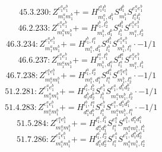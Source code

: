 \documentclass[letterpaper,10pt,fleqn,leqno,onecolumn]{article}
\begin{document}
\begin{equation} \;\;\;\;\;\;  45.3.230: Z^{e_{1}^{a}e_{1}^{b}}_{m_{1}^{a}m_{1}^{b}}+=H^{l_{1}^{a}l_{1}^{b}}_{m_{1}^{a},d_{1}^{b}}S^{d_{1}^{b}}_{m_{1}^{b}}S^{e_{1}^{a}e_{1}^{b}}_{l_{1}^{a}l_{1}^{b}} \end{equation}
\begin{equation} \;\;\;\;\;\;  46.2.233: Z^{e_{1}^{a}e_{1}^{b}}_{m_{1}^{a}m_{1}^{b}}+=H^{l_{1}^{b},l_{2}^{b}}_{m_{1}^{b},d_{1}^{b}}S^{d_{1}^{b}}_{l_{1}^{b}}S^{e_{1}^{a}e_{1}^{b}}_{m_{1}^{a},l_{2}^{b}} \end{equation}
\begin{equation} \;\;\;\;\;\;  46.3.234: Z^{e_{1}^{a}e_{1}^{b}}_{m_{1}^{a}m_{1}^{b}}+=H^{l_{1}^{b},l_{1}^{a}}_{m_{1}^{a},d_{1}^{b}}S^{d_{1}^{b}}_{l_{1}^{b}}S^{e_{1}^{a}e_{1}^{b}}_{m_{1}^{b},l_{1}^{a}}\cdot -1/1 \end{equation}
\begin{equation} \;\;\;\;\;\;  46.6.237: Z^{e_{1}^{a}e_{1}^{b}}_{m_{1}^{a}m_{1}^{b}}+=H^{l_{1}^{a},l_{1}^{b}}_{m_{1}^{b},d_{1}^{a}}S^{d_{1}^{a}}_{l_{1}^{a}}S^{e_{1}^{a}e_{1}^{b}}_{m_{1}^{a},l_{1}^{b}} \end{equation}
\begin{equation} \;\;\;\;\;\;  46.7.238: Z^{e_{1}^{a}e_{1}^{b}}_{m_{1}^{a}m_{1}^{b}}+=H^{l_{1}^{a},l_{2}^{a}}_{m_{1}^{a},d_{1}^{a}}S^{d_{1}^{a}}_{l_{1}^{a}}S^{e_{1}^{a}e_{1}^{b}}_{m_{1}^{b},l_{2}^{a}}\cdot -1/1 \end{equation}
\begin{equation} \;\;\;\;\;\;  51.2.281: Z^{e_{1}^{a}e_{1}^{b}}_{m_{1}^{a}m_{1}^{b}}+=H^{l_{1}^{b},l_{2}^{b}}_{d_{1}^{b}d_{2}^{b}}S^{e_{1}^{b}}_{l_{1}^{b}}S^{e_{1}^{a},d_{1}^{b}d_{2}^{b}}_{m_{1}^{a}m_{1}^{b},l_{2}^{b}}\cdot -1/1 \end{equation}
\begin{equation} \;\;\;\;\;\;  51.4.283: Z^{e_{1}^{a}e_{1}^{b}}_{m_{1}^{a}m_{1}^{b}}+=H^{l_{1}^{b},l_{1}^{a}}_{d_{1}^{a}d_{1}^{b}}S^{e_{1}^{b}}_{l_{1}^{b}}S^{e_{1}^{a},d_{1}^{a}d_{1}^{b}}_{m_{1}^{a}m_{1}^{b},l_{1}^{a}}\cdot -1/1 \end{equation}
\begin{equation} \;\;\;\;\;\;  51.5.284: Z^{e_{1}^{a}e_{1}^{b}}_{m_{1}^{a}m_{1}^{b}}+=H^{l_{1}^{a},l_{1}^{b}}_{d_{1}^{a}d_{1}^{b}}S^{e_{1}^{a}}_{l_{1}^{a}}S^{e_{1}^{b},d_{1}^{a}d_{1}^{b}}_{m_{1}^{a}m_{1}^{b},l_{1}^{b}} \end{equation}
\begin{equation} \;\;\;\;\;\;  51.7.286: Z^{e_{1}^{a}e_{1}^{b}}_{m_{1}^{a}m_{1}^{b}}+=H^{l_{1}^{a},l_{2}^{a}}_{d_{1}^{a}d_{2}^{a}}S^{e_{1}^{a}}_{l_{1}^{a}}S^{e_{1}^{b},d_{1}^{a}d_{2}^{a}}_{m_{1}^{a}m_{1}^{b},l_{2}^{a}} \end{equation}
\end{document}

